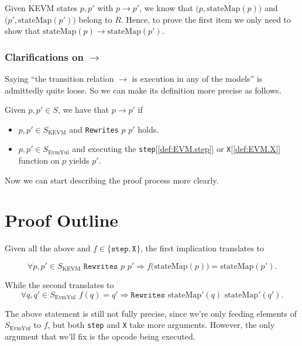 Given KEVM states $p, p'$ with $p \rightarrow p'$, we know that
$\bigl( p, \text{stateMap}(p) \bigr)$ and $\bigl( p', \text{stateMap}(p')
\bigr)$ belong to $R$. Hence, to prove the first item we only need to show that
$\text{stateMap}(p) \rightarrow \text{stateMap}(p')$.

\subsubsection{Clarifications on $\rightarrow$}

Saying ``the transition relation $\rightarrow$ is execution in any of the
models'' is admittedly quite loose. So we can make its definition more precise
as follows.

\begin{definition}
Given $p, p' \in S$, we have that $p\rightarrow p'$ if
\begin{itemize}
\item $p, p'\in S_{\text{KEVM}}$ and \texttt{Rewrites} $p$ $p'$ holds.
\item $p, p'\in S_{\text{EvmYul}}$ and executing the
  \texttt{step}[\ref{def:EVM.step}] or \texttt{X}[\ref{def:EVM.X}] function on $p$ yields $p'$.
\end{itemize}
\end{definition}

Now we can start describing the proof process more clearly.

\section{Proof Outline}

Given all the above and $f\in\{\texttt{step}, \texttt{X}\}$, the first
implication translates to

\begin{equation}\label{eq:bisimulation-explicit1}
\forall p, p'\in S_{\text{KEVM}}\,\, \texttt{Rewrites}\,\, p \,\, p'
\Rightarrow f\bigl(\text{stateMap}(p)\bigr) = \text{stateMap}(p').
\end{equation}

While the second translates to
\begin{equation}\label{eq:bisimulation-explicit2}
\forall q, q'\in S_{\text{EvmYul}}\,\, f(q) = q' \Rightarrow
\texttt{Rewrites}\,\, \text{stateMap}'(q)\,\, \text{stateMap}'(q').
\end{equation}

The above statement is still not fully precise, since we're only feeding
elements of $S_{\text{EvmYul}}$ to $f$, but both \texttt{step} and \texttt{X}
take more arguments. However, the only argument that we'll fix is the opcode
being executed.

